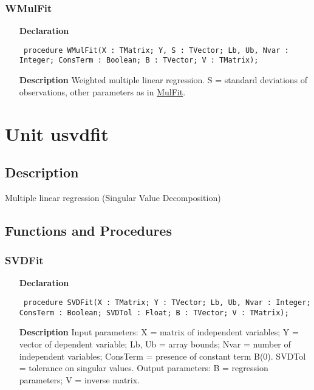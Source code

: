 \documentclass[12pt,a4paper,oneside]{report}
\newcommand{\declarationitem}[1]{\textbf{#1}}
\newcommand{\descriptiontitle}[1]{\textbf{#1}}
\newcommand{\code}[1]{\texttt{#1}}
\begin{document}
\subsubsection{WMulFit}
\label{umulfit-WMulFit}
\begin{itemize}\item[\declarationitem{Declaration}\hfill]
	\begin{flushleft}
		\code{
			procedure WMulFit(X : TMatrix; Y, S : TVector; Lb, Ub, Nvar : Integer; ConsTerm : Boolean; B : TVector; V : TMatrix);}
		
	\end{flushleft}
	
	\par
	\item[\descriptiontitle{Description}]
	Weighted multiple linear regression. S = standard deviations of observations, other parameters as in \hyperref[umulfit-MulFit]{MulFit}.
	
\end{itemize}
\section{Unit usvdfit}
\label{usvdfit}
\subsection{Description}
Multiple linear regression (Singular Value Decomposition) 
\subsection{Functions and Procedures}
\subsubsection{SVDFit}
\label{usvdfit-SVDFit}
\begin{itemize}\item[\declarationitem{Declaration}\hfill]
	\begin{flushleft}
		\code{
			procedure SVDFit(X : TMatrix; Y : TVector; Lb, Ub, Nvar : Integer; ConsTerm : Boolean; SVDTol : Float; B : TVector; V : TMatrix);}
		
	\end{flushleft}
	
	\par
	\item[\descriptiontitle{Description}]
	Input parameters: X = matrix of independent variables; Y = vector of dependent variable; Lb, Ub = array bounds; Nvar = number of independent variables; ConsTerm = presence of constant term B(0). SVDTol = tolerance on singular values. Output parameters: B = regression parameters; V = inverse matrix.
	
\end{itemize}
\end{document}
